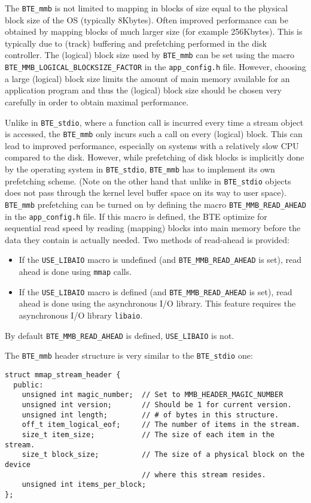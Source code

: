 The \verb|BTE_mmb| is not limited to mapping in blocks of size equal to the
physical block size of the OS (typically 8Kbytes). Often improved
performance can be obtained by mapping blocks of much larger size (for
example 256Kbytes). This is typically due to (track) buffering and
prefetching performed in the disk controller. The (logical) block size used
by \verb|BTE_mmb| can be set using the macro
\verb|BTE_MMB_LOGICAL_BLOCKSIZE_FACTOR| in the \verb|app_config.h|
file. However, choosing a large (logical) block size limits the amount of
main memory available for an application program and thus the (logical)
block size should be chosen very carefully in order to obtain maximal
performance.

Unlike in \verb|BTE_stdio|, where a function call is incurred every time a
stream object is accessed, the \verb|BTE_mmb| only incurs such a call on
every (logical) block. This can lead to improved performance, especially on
systems with a relatively slow CPU compared to the disk. However, while
prefetching of disk blocks is implicitly done by the operating system in
\verb|BTE_stdio|, \verb|BTE_mmb| has to implement its own prefetching
scheme. (Note on the other hand that unlike in \verb|BTE_stdio| objects
does not pass through the kernel level buffer space on its way to user
space). \verb|BTE_mmb| prefetching can be turned on by defining the macro
\verb|BTE_MMB_READ_AHEAD| in the \verb|app_config.h| file. If this macro is
defined, the BTE optimize for sequential read speed by reading (mapping)
blocks into main memory before the data they contain is actually
needed. Two methods of read-ahead is provided:
\begin{itemize}
\item If the \verb|USE_LIBAIO| macro is undefined (and
\verb|BTE_MMB_READ_AHEAD| is set), read ahead is done using \verb|mmap|
calls.
\item If the \verb|USE_LIBAIO| macro is defined (and
\verb|BTE_MMB_READ_AHEAD| is set), read ahead is done using the
asynchronous I/O library. This feature requires the asynchronous I/O
library {\tt libaio}.
\end{itemize}
By default \verb|BTE_MMB_READ_AHEAD| is defined, \verb|USE_LIBAIO| is
not.

The \verb|BTE_mmb| header structure is very similar to the \verb|BTE_stdio|
one:
\begin{verbatim}
struct mmap_stream_header { 
  public:
    unsigned int magic_number;  // Set to MMB_HEADER_MAGIC_NUMBER
    unsigned int version;       // Should be 1 for current version.
    unsigned int length;        // # of bytes in this structure.
    off_t item_logical_eof;     // The number of items in the stream.
    size_t item_size;           // The size of each item in the stream.
    size_t block_size;          // The size of a physical block on the device
                                // where this stream resides.
    unsigned int items_per_block;
};
\end{verbatim}

